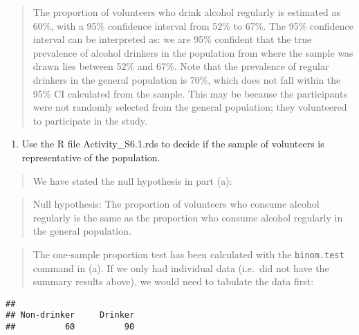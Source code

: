 \documentclass[
]{memoir}
\newenvironment{Shaded}{\begin{snugshade}}{\end{snugshade}}
\newcommand{\FunctionTok}[1]{\textcolor[rgb]{0.00,0.00,0.00}{#1}}
\newcommand{\NormalTok}[1]{#1}
\newcommand{\OtherTok}[1]{\textcolor[rgb]{0.56,0.35,0.01}{#1}}
\newcommand{\SpecialCharTok}[1]{\textcolor[rgb]{0.00,0.00,0.00}{#1}}
\newcommand{\StringTok}[1]{\textcolor[rgb]{0.31,0.60,0.02}{#1}}
\providecommand{\tightlist}{%
  \setlength{\itemsep}{0pt}\setlength{\parskip}{0pt}}
\begin{document}
\begin{quote}
The proportion of volunteers who drink alcohol regularly is estimated as 60\%, with a 95\% confidence interval from 52\% to 67\%. The 95\% confidence interval can be interpreted as: we are 95\% confident that the true prevalence of alcohol drinkers in the population from where the sample was drawn lies between 52\% and 67\%. Note that the prevalence of regular drinkers in the general population is 70\%, which does not fall within the 95\% CI calculated from the sample. This may be because the participants were not randomly selected from the general population; they volunteered to participate in the study.
\end{quote}

\begin{enumerate}
\def\labelenumi{\alph{enumi})}
\setcounter{enumi}{2}
\tightlist
\item
  Use the R file Activity\_S6.1.rds to decide if the sample of volunteers is representative of the population.
\end{enumerate}

\begin{quote}
We have stated the null hypothesis in part (a):
\end{quote}

\begin{quote}
Null hypothesis: The proportion of volunteers who consume alcohol regularly is the same as the proportion who consume alcohol regularly in the general population.
\end{quote}

\begin{quote}
The one-sample proportion test has been calculated with the \texttt{binom.test} command in (a). If we only had individual data (i.e.~did not have the summary results above), we would need to tabulate the data first:
\end{quote}

\begin{Shaded}
\end{Shaded}

\begin{verbatim}
## 
## Non-drinker     Drinker 
##          60          90
\end{verbatim}
\end{document}
